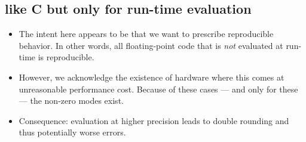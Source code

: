 \subsection{like C but only for run-time evaluation}\label{d:3}

\begin{itemize}
  \item The intent here appears to be that we want to prescribe reproducible
    \fp behavior.
    In other words, all floating-point code that is \emph{not} evaluated at
    run-time is reproducible.

  \item However, we acknowledge the existence of hardware where this comes at
    unreasonable performance cost. Because of these cases --- and only for
    these --- the non-zero  modes exist.

  \item Consequence: evaluation at higher precision leads to double rounding
    and thus potentially worse errors.
\end{itemize}
